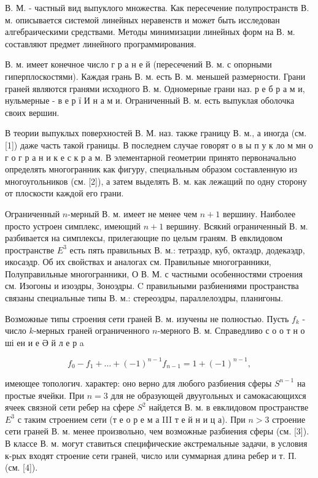 \documentclass[10pt]{article}
\begin{document}
В. М. - частный вид выпуклого множества. Как пересечение полупространств В. м. описывается системой линейных неравенств и может быть исследован алгебраическими средствами. Методы минимизации линейных форм на В. м. составляют предмет линейного программирования.



В. м. имеет конечное число г р а н е й (пересечений В. м. с опорными гиперплоскостями). Каждая грань В. м. есть В. м. меньшей размерности. Грани граней являются гранями исходного В. м. Одномерные грани наз. р е б р а м и, нульмерные - в е р ї И н а м и. Ограниченный В. м. есть выпуклая оболочка своих вершин.



В теории выпуклых поверхностей В. М. наз. также границу В. м., а иногда (см. [1]) даже часть такой границы. В последнем случае говорят о в ы п у к ло м мн о г о г р а н и к е с к р а м. В элементарной геометрии принято первоначально определять многогранник как фигуру, специальным образом составленную из многоугольников (см. [2]), а затем выделять В. м. как лежащий по одну сторону от плоскости каждой его грани.



Ограниченный $n$-мерный В. м. имеет не менее чем $n+1$ вершину. Наиболее просто устроен симплекс, имеющий $n+1$ вершину. Всякий ограниченный В. м. разбивается на симплексы, прилегающие по целым граням. В евклидовом пространстве $E^{3}$ есть пять правильных В. м.: тетраэдр, куб, октаэдр, додекаэдр, икосаэдр. Об их свойствах и аналогах см. Правильные многогранники, Полуправильные многогранники, О В. М. с частными особенностями строения см. Изогоны $и$ изоэдры, Зоноэдры. C правильными разбиениями пространства связаны специальные типы В. м.: стереоэдры, параллелоэдры, планигоны.



Возможные типы строения сети граней В. м. изучены не полностью. Пусть $f_{k}$ - число $k$-мерных граней ограниченного $n$-мерного В. м. Справедливо с о о т н о ші ен и е Ә й л е р a



\[

f_{0}-f_{1}+\ldots+(-1)^{n-1} f_{n-1}=1+(-1)^{n-1},

\]



имеющее топологич. характер: оно верно для любого разбиения сферы $S^{n-1}$ на простые ячейки. При $n=3$ для не образующей двуугольных и самокасающихся ячеек связной сети ребер на сфере $S^{2}$ найдется В. м. в евклидовом пространстве $E^{3}$ с таким строением сети (т е о р е м а III т е й н и ц а). При $n>3$ строение сети граней В. м. менее произвольно, чем возможные разбиения сферы (см. [3]). В классе В. м. могут ставиться специфические әкстремальные задачи, в условия к-рых входят строение сети граней, число или суммарная длина ребер и т. П. (см. [4]).
\end{document}
